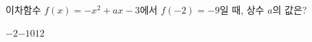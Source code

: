 이차함수 $f(x)=-x^2+ax-3$에서 $f(-2)=-9$일 때, 상수 $a$의 값은?
\begin{choices32}{$-2$}{$-1$}{$0$}{$1$}{$2$}\end{choices32}
